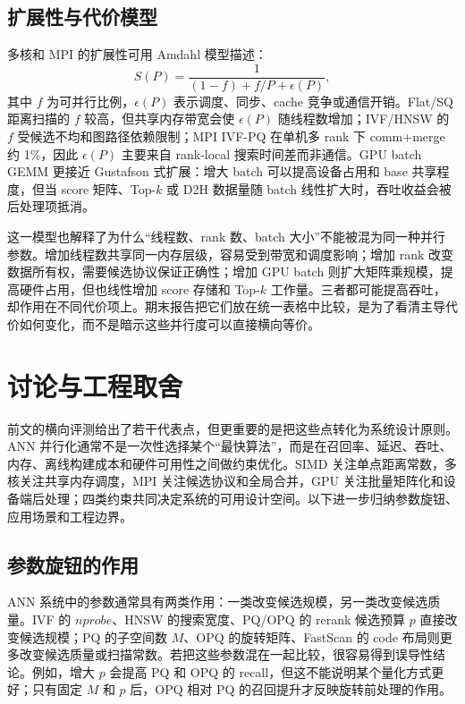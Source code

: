\documentclass[a4paper,11pt,UTF8]{ctexart}
\begin{document}
\subsection{扩展性与代价模型}

多核和 MPI 的扩展性可用 Amdahl 模型描述：
\[
S(P)=\frac{1}{(1-f)+f/P+\epsilon(P)} ,
\]
其中 $f$ 为可并行比例，$\epsilon(P)$ 表示调度、同步、cache 竞争或通信开销。Flat/SQ 距离扫描的 $f$ 较高，但共享内存带宽会使 $\epsilon(P)$ 随线程数增加；IVF/HNSW 的 $f$ 受候选不均和图路径依赖限制；MPI IVF-PQ 在单机多 rank 下 comm+merge 约 1\%，因此 $\epsilon(P)$ 主要来自 rank-local 搜索时间差而非通信。GPU batch GEMM 更接近 Gustafson 式扩展：增大 batch 可以提高设备占用和 base 共享程度，但当 score 矩阵、Top-$k$ 或 D2H 数据量随 batch 线性扩大时，吞吐收益会被后处理项抵消。

这一模型也解释了为什么“线程数、rank 数、batch 大小”不能被混为同一种并行参数。增加线程数共享同一内存层级，容易受到带宽和调度影响；增加 rank 改变数据所有权，需要候选协议保证正确性；增加 GPU batch 则扩大矩阵乘规模，提高硬件占用，但也线性增加 score 存储和 Top-$k$ 工作量。三者都可能提高吞吐，却作用在不同代价项上。期末报告把它们放在统一表格中比较，是为了看清主导代价如何变化，而不是暗示这些并行度可以直接横向等价。



\section{讨论与工程取舍}

前文的横向评测给出了若干代表点，但更重要的是把这些点转化为系统设计原则。ANN 并行化通常不是一次性选择某个“最快算法”，而是在召回率、延迟、吞吐、内存、离线构建成本和硬件可用性之间做约束优化。SIMD 关注单点距离常数，多核关注共享内存调度，MPI 关注候选协议和全局合并，GPU 关注批量矩阵化和设备端后处理；四类约束共同决定系统的可用设计空间。以下进一步归纳参数旋钮、应用场景和工程边界。

\subsection{参数旋钮的作用}

ANN 系统中的参数通常具有两类作用：一类改变候选规模，另一类改变候选质量。IVF 的 $nprobe$、HNSW 的搜索宽度、PQ/OPQ 的 rerank 候选预算 $p$ 直接改变候选规模；PQ 的子空间数 $M$、OPQ 的旋转矩阵、FastScan 的 code 布局则更多改变候选质量或扫描常数。若把这些参数混在一起比较，很容易得到误导性结论。例如，增大 $p$ 会提高 PQ 和 OPQ 的 recall，但这不能说明某个量化方式更好；只有固定 $M$ 和 $p$ 后，OPQ 相对 PQ 的召回提升才反映旋转前处理的作用。
\end{document}
